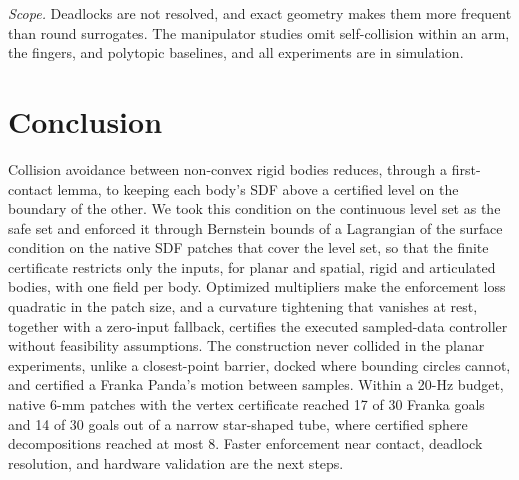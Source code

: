 \documentclass[journal]{IEEEtran}
\theoremstyle{definition}
\begin{document}
\emph{Scope.} Deadlocks are not resolved, and exact geometry makes them more frequent than round
surrogates. The manipulator studies omit self-collision within an arm, the fingers, and polytopic
baselines, and all experiments are in simulation.

\section{Conclusion}\label{sec:concl}
Collision avoidance between non-convex rigid bodies reduces, through a first-contact lemma, to
keeping each body's SDF above a certified level on the boundary of the other. We took this condition
on the continuous level set as the safe set and enforced it through Bernstein bounds of a Lagrangian
of the surface condition on the native SDF patches that cover the level set, so that the finite
certificate restricts only the inputs, for planar and spatial, rigid and articulated bodies, with
one field per body. Optimized multipliers make the enforcement loss quadratic in the patch size, and
a curvature tightening that vanishes at rest, together with a zero-input fallback, certifies the
executed sampled-data controller without feasibility assumptions. The construction never collided in
the planar experiments, unlike a closest-point barrier, docked where bounding circles cannot, and
certified a Franka Panda's motion between samples. Within a 20-Hz budget, native 6-mm patches with
the vertex certificate reached 17 of 30 Franka goals and 14 of 30 goals out of a narrow star-shaped
tube, where certified sphere decompositions reached at most 8. Faster enforcement near contact, deadlock resolution, and hardware validation are the next
steps.



\end{document}
